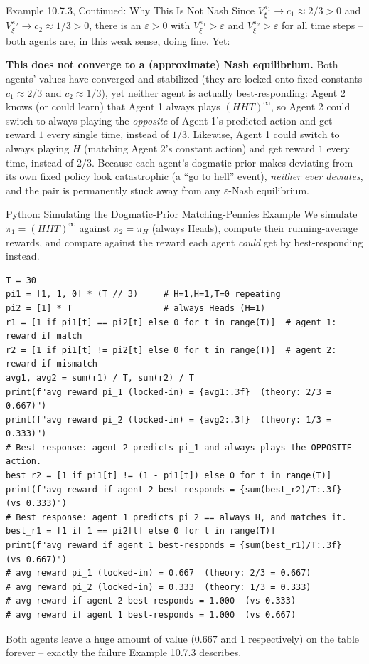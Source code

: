 \documentclass[aspectratio=169,10pt]{beamer}
\begin{document}
\begin{frame}{Example 10.7.3, Continued: Why This Is Not Nash}
  Since $V_\xi^{\pi_1}\to c_1\approx2/3>0$ and $V_\xi^{\pi_2}\to
  c_2\approx1/3>0$, there is an $\varepsilon>0$ with
  $V_\xi^{\pi_1}>\varepsilon$ and $V_\xi^{\pi_2}>\varepsilon$ for all time
  steps -- both agents are, in this weak sense, doing fine. Yet:

  \vspace{0.3em}
  \textbf{This does not converge to a (approximate) Nash equilibrium.}
  Both agents' values have converged and stabilized (they are locked onto
  fixed constants $c_1\approx2/3$ and $c_2\approx1/3$), yet neither agent
  is actually best-responding: Agent 2 knows (or could learn) that Agent 1
  always plays $(HHT)^\infty$, so Agent 2 could switch to always playing
  the \emph{opposite} of Agent 1's predicted action and get reward $1$
  every single time, instead of $1/3$. Likewise, Agent 1 could switch to
  always playing $H$ (matching Agent 2's constant action) and get reward
  $1$ every time, instead of $2/3$. Because each agent's dogmatic prior
  makes deviating from its own fixed policy look catastrophic (a ``go to
  hell'' event), \emph{neither ever deviates}, and the pair is permanently
  stuck away from any $\varepsilon$-Nash equilibrium.
\end{frame}

\begin{frame}[fragile]{Python: Simulating the Dogmatic-Prior Matching-Pennies Example}
  We simulate $\pi_1=(HHT)^\infty$ against $\pi_2=\pi_H$ (always Heads),
  compute their running-average rewards, and compare against the reward
  each agent \emph{could} get by best-responding instead.
  \begin{lstlisting}[style=pycode]
T = 30
pi1 = [1, 1, 0] * (T // 3)     # H=1,H=1,T=0 repeating
pi2 = [1] * T                  # always Heads (H=1)
r1 = [1 if pi1[t] == pi2[t] else 0 for t in range(T)]  # agent 1: reward if match
r2 = [1 if pi1[t] != pi2[t] else 0 for t in range(T)]  # agent 2: reward if mismatch
avg1, avg2 = sum(r1) / T, sum(r2) / T
print(f"avg reward pi_1 (locked-in) = {avg1:.3f}  (theory: 2/3 = 0.667)")
print(f"avg reward pi_2 (locked-in) = {avg2:.3f}  (theory: 1/3 = 0.333)")
# Best response: agent 2 predicts pi_1 and always plays the OPPOSITE action.
best_r2 = [1 if pi1[t] != (1 - pi1[t]) else 0 for t in range(T)]
print(f"avg reward if agent 2 best-responds = {sum(best_r2)/T:.3f}  (vs 0.333)")
# Best response: agent 1 predicts pi_2 == always H, and matches it.
best_r1 = [1 if 1 == pi2[t] else 0 for t in range(T)]
print(f"avg reward if agent 1 best-responds = {sum(best_r1)/T:.3f}  (vs 0.667)")
# avg reward pi_1 (locked-in) = 0.667  (theory: 2/3 = 0.667)
# avg reward pi_2 (locked-in) = 0.333  (theory: 1/3 = 0.333)
# avg reward if agent 2 best-responds = 1.000  (vs 0.333)
# avg reward if agent 1 best-responds = 1.000  (vs 0.667)
  \end{lstlisting}
  Both agents leave a huge amount of value ($0.667$ and $1$ respectively)
  on the table forever -- exactly the failure Example 10.7.3 describes.
\end{frame}
\end{document}
